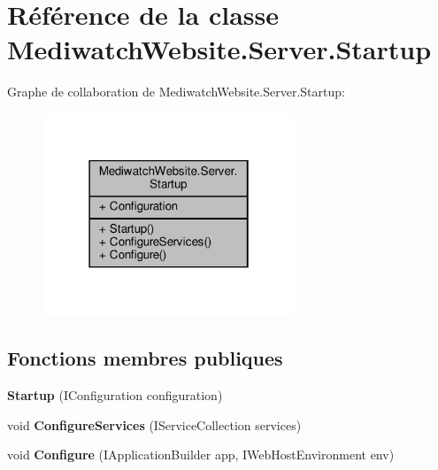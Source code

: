 \hypertarget{class_mediwatch_website_1_1_server_1_1_startup}{}\section{Référence de la classe Mediwatch\+Website.\+Server.\+Startup}
\label{class_mediwatch_website_1_1_server_1_1_startup}


Graphe de collaboration de Mediwatch\+Website.\+Server.\+Startup\+:
\nopagebreak
\begin{figure}[H]
\begin{center}
\leavevmode
\includegraphics[width=214pt]{class_mediwatch_website_1_1_server_1_1_startup__coll__graph}
\end{center}
\end{figure}
\subsection*{Fonctions membres publiques}
\begin{DoxyCompactItemize}
\item 
\mbox{\label{class_mediwatch_website_1_1_server_1_1_startup_ad316a2daabb5739ffe24d385529a2fb7}} 
{\bfseries Startup} (I\+Configuration configuration)
\item 
\mbox{\label{class_mediwatch_website_1_1_server_1_1_startup_abbc6953beb2140feccf70e0ab6e4b12b}} 
void {\bfseries Configure\+Services} (I\+Service\+Collection services)
\item 
\mbox{\label{class_mediwatch_website_1_1_server_1_1_startup_adca78a113e96adf3237be1a5d92012c0}} 
void {\bfseries Configure} (I\+Application\+Builder app, I\+Web\+Host\+Environment env)
\end{DoxyCompactItemize}
